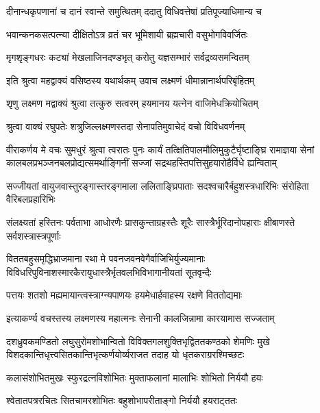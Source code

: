 \twolineshloka
{दीनान्धकृपणानां च दानं स्वान्ते समुत्थितम्}
{ददातु विधिवत्तेषां प्रतिपूज्याधिमान्य च}%

\twolineshloka
{भवान्कनकसत्पत्न्या दीक्षितोऽत्र व्रतं चर}
{भूमिशायी ब्रह्मचारी वसुभोगविवर्जितः}%

\twolineshloka
{मृगशृङ्गधरः कट्यां मेखलाजिनदण्डभृत्}
{करोतु यज्ञसम्भारं सर्वद्रव्यसमन्वितम्}%

\twolineshloka
{इति श्रुत्वा महद्वाक्यं वसिष्ठस्य यथार्थकम्}
{उवाच लक्ष्मणं धीमान्नानार्थपरिबृंहितम्}%


\twolineshloka
{शृणु लक्ष्मण मद्वाक्यं श्रुत्वा तत्कुरु सत्वरम्}
{हयमानय यत्नेन वाजिमेधक्रियोचितम्}%


\twolineshloka
{श्रुत्वा वाक्यं रघुपतेः शत्रुजिल्लक्ष्मणस्तदा}
{सेनापतिमुवाचेदं वचो विविधवर्णनम्}%


\fourlineindentedshloka
{वीराकर्णय मे वचः सुमधुरं श्रुत्वा त्वरातः पुनः}
{कार्यं तत्क्षितिपालमौलिमुकुटैर्घृष्टाङ्घ्रि रामाज्ञया}
{सेनां कालबलप्रभञ्जनबलप्रोद्यत्समर्थाङ्गिनीं}
{सज्जां सद्रथहस्तिपत्तिसुहयारोहैर्विधे ह्यन्विताम्}%

\twolineshloka
{सज्जीयतां वायुजवास्तुरङ्गास्तरङ्गमाला ललिताङ्घ्रिपाताः}
{सदश्वचारैर्बहुशस्त्रधारिभिः संरोहिता वैरिबलप्रहारिभिः}%

\twolineshloka
{संलक्ष्यतां हस्तिनः पर्वताभा आधोरणैः प्रासकुन्ताग्रहस्तैः}
{शूरैः सास्त्रैर्भूरिदानोपहाराः क्षीबाणस्ते सर्वशस्त्रास्त्रपूर्णाः}%

\twolineshloka
{विततबहुसमृद्धिभ्राजमाना रथा मे पवनजवनवेगैर्वाजिभिर्युज्यमानाः}
{विविधरिपुविनाशस्मारकैरायुधास्त्रैर्भृतवलभिविभागानीयतां सूतवृन्दैः}%

\twolineshloka
{पत्तयः शतशो मह्यमायान्त्वस्त्राग्न्यपाणयः}
{हयमेधार्हवाहस्य रक्षणे विततोद्यमाः}%

\twolineshloka
{इत्याकर्ण्य वचस्तस्य लक्ष्मणस्य महात्मनः}
{सेनानी कालजिन्नामा कारयामास सज्जताम्}%

\twolineshloka
{दशध्रुवकमण्डितो लघुसुरोमशोभान्वितो विविक्तगलशुक्तिभृद्विततकण्ठको शेमणिः मुखे}
{विशदकान्तिधृत्त्वसितकान्तिभृत्कर्णयोर्व्यराजत तदाह यो धृतकराग्ररश्मिच्छटः}%

\twolineshloka
{कलासंशोभितमुखः स्फुरद्रत्नविशोभितः}
{मुक्ताफलानां मालाभिः शोभितो निर्ययौ हयः}%

\twolineshloka
{श्वेतातपत्ररचितः सितचामरशोभितः}
{बहुशोभापरीताङ्गो निर्ययौ हयराट्ततः}%

